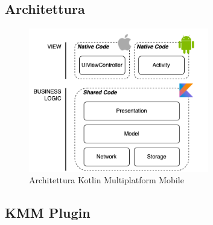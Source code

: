 \subsection{Architettura}
\begin{figure}[H]
\centering
\includegraphics[width=0.7\textwidth]{img/tesi-8-kmm.drawio.png}
\caption{Architettura Kotlin Multiplatform Mobile}
\end{figure}

\subsection{KMM Plugin}